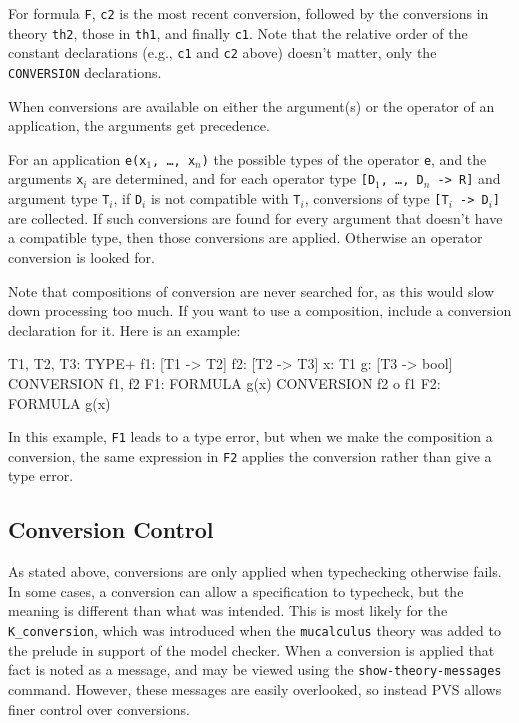 For formula \texttt{F}, \texttt{c2} is the most recent conversion,
followed by the conversions in theory \texttt{th2}, those in \texttt{th1},
and finally \texttt{c1}.  Note that the relative order of the constant
declarations (e.g., \texttt{c1} and \texttt{c2} above) doesn't matter,
only the \texttt{CONVERSION} declarations.

When conversions are available on either the argument(s) or the operator
of an application, the arguments get precedence.

For an application \texttt{e(x$_1$, \ldots, x$_n$)} the possible types of
the operator \texttt{e}, and the arguments \texttt{x$_i$} are determined,
and for each operator type \texttt{[D$_1$, \ldots, D$_n$ -> R]} and
argument type \texttt{T$_i$}, if \texttt{D$_i$} is not compatible with
\texttt{T$_i$}, conversions of type \texttt{[T$_i$ -> D$_i$]} are
collected.  If such conversions are found for every argument that doesn't
have a compatible type, then those conversions are applied.  Otherwise an
operator conversion is looked for.

Note that compositions of conversion are never searched for, as this would
slow down processing too much.  If you want to use a composition, include
a conversion declaration for it.  Here is an example:
\begin{session}
  T1, T2, T3: TYPE+
  f1: [T1 -> T2]
  f2: [T2 -> T3]
  x: T1
  g: [T3 -> bool]
  CONVERSION f1, f2
  F1: FORMULA g(x)
  CONVERSION f2 o f1
  F2: FORMULA g(x)
\end{session}
In this example, \texttt{F1} leads to a type error, but when we make the
composition a conversion, the same expression in \texttt{F2} applies the
conversion rather than give a type error.

\subsection{Conversion Control}

As stated above, conversions are only applied when typechecking otherwise
fails.  In some cases, a conversion can allow a specification to
typecheck, but the meaning is different than what was intended.  This is
most likely for the \texttt{K\_conversion}, which was introduced when the
\texttt{mucalculus} theory was added to the prelude in support of the
model checker.  When a conversion is applied that fact is noted as a
message, and may be viewed using the \texttt{show-theory-messages}
command.  However, these messages are easily overlooked, so instead PVS
allows finer control over conversions.

